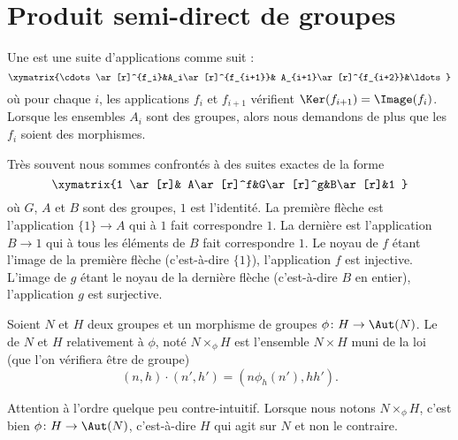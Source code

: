 
\section{Produit semi-direct de groupes}

\begin{definition}
	Une  est une suite d'applications comme suit :
	\begin{equation}
		\xymatrix{%
		\cdots \ar[r]^{f_i}&A_i\ar[r]^{f_{i+1}}& A_{i+1}\ar[r]^{f_{i+2}}&\ldots
		}
	\end{equation}
	où pour chaque \( i\), les applications \( f_i\) et \( f_{i+1}\) vérifient \( \Ker(f_{i+1})=\Image(f_i)\). Lorsque les ensembles \( A_i\) sont des groupes, alors nous demandons de plus que les \( f_i\) soient des morphismes.
\end{definition}

Très souvent nous sommes confrontés à des suites exactes de la forme
\begin{equation}
	\xymatrix{%
		1 \ar[r]& A\ar[r]^f&G\ar[r]^g&B\ar[r]&1
	}
\end{equation}
où \( G\), \( A\) et \( B\) sont des groupes, \( 1\) est l'identité. La première flèche est l'application \( \{ 1 \}\to A\) qui à \( 1\) fait correspondre \( 1\). La dernière est l'application \( B\to 1\) qui à tous les éléments de \( B\) fait correspondre \( 1\). Le noyau de \( f\) étant l'image de la première flèche (c'est-à-dire \( \{ 1 \}\)), l'application \( f\) est injective. L'image de \( g\) étant le noyau de la dernière flèche (c'est-à-dire \( B\) en entier), l'application \( g\) est surjective.

\begin{definition}     \label{DEFooKWEHooISNQzi}
	Soient \( N\) et \( H\) deux groupes et un morphisme de groupes \( \phi\colon H\to \Aut(N)\). Le  de \( N\) et \( H\) relativement à \( \phi\), noté \( N\times_{\phi}H\) est l'ensemble \( N\times H\) muni de la loi (que l'on vérifiera être de groupe)
	\begin{equation}\label{EqDRgbBI}
		(n,h)\cdot (n',h')=(n\phi_h(n'),hh').
	\end{equation}
\end{definition}
Attention à l'ordre quelque peu contre-intuitif. Lorsque nous notons \( N\times_{\phi}H\), c'est bien \( \phi\colon H\to \Aut(N)\), c'est-à-dire \( H\) qui agit sur \( N\) et non le contraire.


